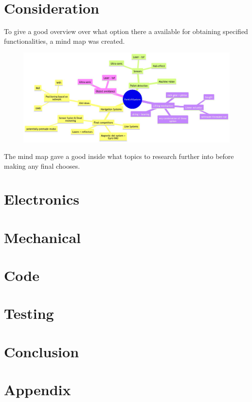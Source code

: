 \documentclass[11pt,table]{article}
\begin{document}
\section{Consideration}
    To give a good overview over what option there a available for obtaining
    specified functionalities, a mind map was created.
    \begin{figure}[H]
        \centering
        \includegraphics[width=0.8\linewidth]{MindmapForkliftSystemSolutions.md.1.png}
    \end{figure}   
    The mind map gave a good inside what topics to research further into before
    making any final chooses.
    
    
    
\section{Electronics}
    
    
\section{Mechanical}
    
    
    
    
\section{Code}
    
    
    
\section{Testing}
    
\section{Conclusion}

\newpage
\section{Appendix}

\begin{multicols}{2}

\end{multicols}


\newpage
\end{document}

